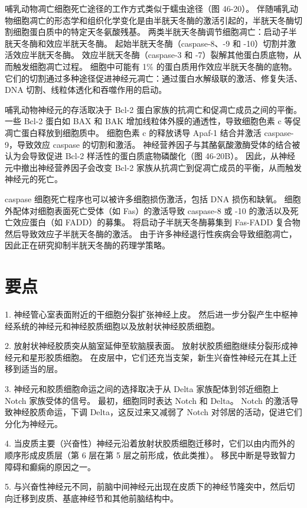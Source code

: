 哺乳动物凋亡细胞死亡途径的工作方式类似于蠕虫途径（图 46-20）。 伴随哺乳动物细胞凋亡的形态学和组织化学变化是由半胱天冬酶的激活引起的，半胱天冬酶切割细胞蛋白质中的特定天冬氨酸残基。 两类半胱天冬酶调节细胞凋亡：启动子半胱天冬酶和效应半胱天冬酶。 起始半胱天冬酶（caspase-8、-9 和 -10）切割并激活效应半胱天冬酶。 效应半胱天冬酶（caspase-3 和 -7）裂解其他蛋白质底物，从而触发细胞凋亡过程。 细胞中可能有 1\% 的蛋白质用作效应半胱天冬酶的底物。 它们的切割通过多种途径促进神经元凋亡：通过蛋白水解级联的激活、修复失活、DNA 切割、线粒体透化和吞噬作用的启动。

哺乳动物神经元的存活取决于 Bcl-2 蛋白家族的抗凋亡和促凋亡成员之间的平衡。 一些 Bcl-2 蛋白如 BAX 和 BAK 增加线粒体外膜的通透性，导致细胞色素 c 等促凋亡蛋白释放到细胞质中。 细胞色素 c 的释放诱导 Apaf-1 结合并激活 caspase-9，导致效应 caspase 的切割和激活。 神经营养因子与其酪氨酸激酶受体的结合被认为会导致促进 Bcl-2 样活性的蛋白质底物磷酸化（图 46-20B）。 因此，从神经元中撤出神经营养因子会改变 Bcl-2 家族从抗凋亡到促凋亡成员的平衡，从而触发神经元的死亡。

caspase 细胞死亡程序也可以被许多细胞损伤激活，包括 DNA 损伤和缺氧。 细胞外配体对细胞表面死亡受体（如 Fas）的激活导致 caspase-8 或 -10 的激活以及死亡效应蛋白（如 FADD）的募集。 将启动子半胱天冬酶募集到 Fas-FADD 复合物然后导致效应子半胱天冬酶的激活。 由于许多神经退行性疾病会导致细胞凋亡，因此正在研究抑制半胱天冬酶的药理学策略。


\section{要点}
1. 神经管心室表面附近的干细胞分裂扩张神经上皮。 然后进一步分裂产生中枢神经系统的神经元和神经胶质细胞以及放射状神经胶质细胞。 

2. 放射状神经胶质突从脑室延伸至软脑膜表面。 放射状胶质细胞继续分裂形成神经元和星形胶质细胞。 在皮层中，它们还充当支架，新生兴奋性神经元在其上迁移到适当的层。 

3. 神经元和胶质细胞命运之间的选择取决于从 Delta 家族配体到邻近细胞上 Notch 家族受体的信号。 最初，细胞同时表达 Notch 和 Delta。 Notch 的激活导致神经胶质命运，下调 Delta，这反过来又减弱了 Notch 对邻居的活动，促进它们分化为神经元。 

4. 当皮质主要（兴奋性）神经元沿着放射状胶质细胞迁移时，它们以由内而外的顺序形成皮质层（第 6 层在第 5 层之前形成，依此类推）。 移民中断是导致智力障碍和癫痫的原因之一。 

5. 与兴奋性神经元不同，前脑中间神经元出现在皮质下的神经节隆突中，然后切向迁移到皮质、基底神经节和其他前脑结构中。 

